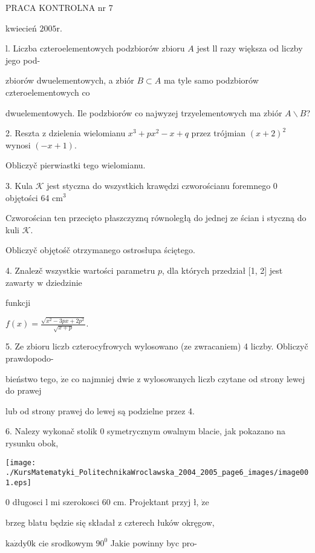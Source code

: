 \documentclass[a4paper,12pt]{article}
\begin{document}
PRACA KONTROLNA nr 7

kwiecień $2005\mathrm{r}.$

l. Liczba czteroelementowych podzbiorów zbioru $A$ jest ll razy większa od liczby jego pod-

zbiorów dwuelementowych, a zbiór $B\subset A$ ma tyle samo podzbiorów czteroelementowych co

dwuelementowych. Ile podzbiorów co najwyzej trzyelementowych ma zbiór $A\backslash B$?

2. Reszta $\mathrm{z}$ dzielenia wielomianu $x^{3}+px^{2}-x+q$ przez trójmian $(x+2)^{2}$ wynosi $(-x+1).$

Obliczyč pierwiastki tego wielomianu.

3. Kula $\mathcal{K}$ jest styczna do wszystkich krawędzi czworościanu foremnego $0$ objętości 64 $\mathrm{c}\mathrm{m}^{3}$

Czworościan ten przecięto płaszczyznq równoległą do jednej ze ścian $\mathrm{i}$ styczną do kuli $\mathcal{K}.$

Obliczyč objętośč otrzymanego ostrosłupa ściętego.

4. Znalez$\acute{}$č wszystkie wartości parametru $p$, dla których przedział [1, 2] jest zawarty $\mathrm{w}$ dziedzinie

funkcji

$f(x)=\displaystyle \frac{\sqrt{x^{2}-3px+2p^{2}}}{\sqrt{x+p}}.$

5. Ze zbioru liczb czterocyfrowych wylosowano (ze zwracaniem) 4 liczby. Obliczyč prawdopodo-

bieństwo tego, $\dot{\mathrm{z}}\mathrm{e}$ co najmniej dwie $\mathrm{z}$ wylosowanych liczb czytane od strony lewej do prawej

lub od strony prawej do lewej są podzielne przez 4.

6. Nalezy wykonač stolik $0$ symetrycznym owalnym blacie, jak pokazano na rysunku obok,
\begin{center}
\texttt{[image: ./KursMatematyki\_PolitechnikaWroclawska\_2004\_2005\_page6\_images/image001.eps]}
\end{center}
$0$ długosci l $\mathrm{m}\mathrm{i}$ szerokosci 60 cm. Projektant przyj ł, $\dot{\mathrm{z}}\mathrm{e}$

brzeg blatu będzie się składał $\mathrm{z}$ czterech łuków okręgow,

$\mathrm{k}\mathrm{a}\dot{\mathrm{z}}\mathrm{d}\mathrm{y}0\mathrm{k}$ cie srodkowym $90^{0}$ Jakie powinny byc pro-
\end{document}

